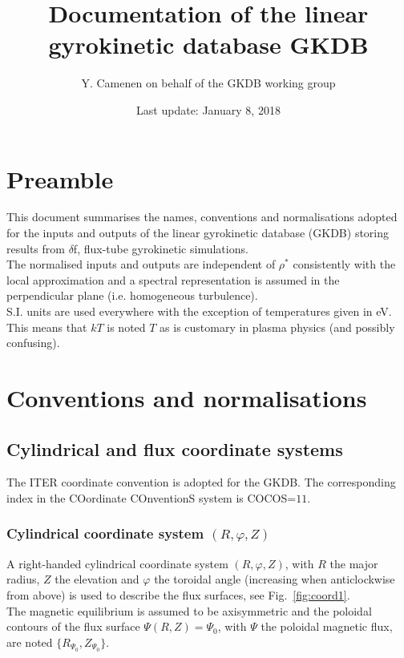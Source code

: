 \documentclass[fleqn]{report}
\begin{document}
\title{Documentation of the linear gyrokinetic database GKDB}

\author{Y. Camenen on behalf of the GKDB working group}

\date{Last update: January 8, 2018}

\maketitle


\chapter{Preamble}

This document summarises the names, conventions and normalisations adopted for the inputs and outputs of the linear gyrokinetic database (GKDB) storing results from $\delta$f, flux-tube gyrokinetic simulations.\\ 
The normalised inputs and outputs are independent of $\rho^*$ consistently with the local approximation and a spectral representation is assumed in the perpendicular plane (i.e. homogeneous turbulence).\\
S.I. units are used everywhere with the exception of temperatures given in eV. This means that $kT$ is noted $T$ as is customary in plasma physics (and possibly confusing).



\chapter{Conventions and normalisations}
\label{chap:normdef}
\section{Cylindrical and flux coordinate systems}
The ITER coordinate convention is adopted for the GKDB. The corresponding index in the COordinate COnventionS system  \cite{Sauter:CPC2013} is COCOS=$11$.
\subsection{Cylindrical coordinate system $(R,\varphi,Z)$}
A right-handed cylindrical coordinate system $(R,\varphi,Z)$, with $R$ the major radius, $Z$ the elevation and $\varphi$ the toroidal angle (increasing when anticlockwise from above) is used to describe the flux surfaces, see Fig.~\ref{fig:coord1}. \\
The magnetic equilibrium is assumed to be axisymmetric and the poloidal contours of the flux surface $\Psi(R,Z)=\Psi_0$, with $\Psi$ the poloidal magnetic flux, are noted $\{R_{\Psi_0},Z_{\Psi_0}\}$.
\end{document}
